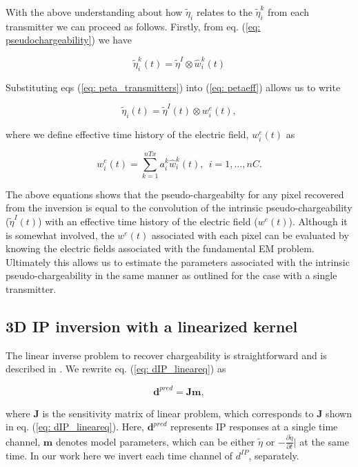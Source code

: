 \documentclass[letterpaper,11pt]{article}
\newcommand{\peta}{\tilde{\eta}}
\begin{document}
With the above understanding about how $\peta_i$ relates to the $\peta_i^k$ from each transmitter we can proceed  as follows. Firstly, from eq. (\ref{eq: pseudochargeability}) we have 
\begin{linenomath*}
\begin{equation}
  \peta_i^k(t) =\peta^I \otimes \hat{w}^{k}_i(t) 
  \label{eq: peta_transmitters}
\end{equation}
\end{linenomath*}
Substituting eqs (\ref{eq: peta_transmitters}) into (\ref{eq: petaeff}) allows us to write
\begin{linenomath*}
\begin{equation}
  \peta_i(t) = \peta^I(t) \otimes w^e_i(t),
\end{equation}
\end{linenomath*}
where we define effective time history of the electric field, $w^e_i(t)$ as 
\begin{linenomath*}
\begin{equation}
  w^e_i(t)= \sum_{k=1}^{nTx} a^k_i \hat{w}^{k}_i(t), \ \ i=1, \ldots, nC.
  \label{eq: we_eff}
\end{equation}
\end{linenomath*}

The above equations shows that the pseudo-chargeabilty for any pixel recovered from the inversion is equal to the convolution of the intrinsic pseudo-chargeability ($\peta^I(t)$) with an effective time history of the electric field ($w^e(t)$). Although it is somewhat involved, the $w^e(t)$ associated with each pixel can be evaluated by knowing the electric fields associated with the fundamental EM problem. Ultimately this allows us to estimate the parameters associated with the intrinsic pseudo-chargeability in the same manner as outlined for the case with a single transmitter. 
\subsection{3D IP inversion with a linearized kernel}
The linear inverse problem to recover chargeability is straightforward and is described in \cite{doug1994}. 
We rewrite eq. (\ref{eq: dIP_lineareq}) as
\begin{linenomath*}
\begin{equation}
  \mathbf{d}^{pred} = \mathbf{J}\mathbf{m},
  \label{eq9}
\end{equation}
\end{linenomath*}
where $\mathbf{J}$ is the  sensitivity matrix of linear problem, which corresponds to $\mathbf{J}$ shown in eq. (\ref{eq: dIP_lineareq}). 
Here, $\mathbf{d}^{pred}$ represents IP responses at a single time channel, $\mathbf{m}$ denotes model parameters, which can be either $\peta$ or $-\frac{\partial \peta}{\partial t}\big|$ at the same time. 
In our work here we invert each time channel of $d^{IP}$, separately. 
\end{document}
